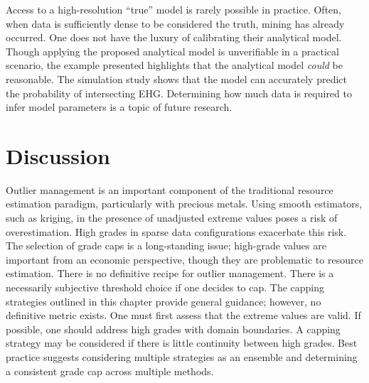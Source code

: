 

Access to a high-resolution ``true'' model is rarely possible in practice. Often, when data is sufficiently dense to be considered the truth, mining has already occurred. One does not have the luxury of calibrating their analytical model. Though applying the proposed analytical model is unverifiable in a practical scenario, the example presented highlights that the analytical model \emph{could} be reasonable. The simulation study shows that the model can accurately predict the probability of intersecting \gls{EHG}. Determining how much data is required to infer model parameters is a topic of future research.

\FloatBarrier
\section{Discussion}
\label{sec:02discuss}

Outlier management is an important component of the traditional resource estimation paradigm, particularly with precious metals. Using smooth estimators, such as kriging, in the presence of unadjusted extreme values poses a risk of overestimation. High grades in sparse data configurations exacerbate this risk. The selection of grade caps is a long-standing issue; high-grade values are important from an economic perspective, though they are problematic to resource estimation. There is no definitive recipe for outlier management. There is a necessarily subjective threshold choice if one decides to cap. The capping strategies outlined in this chapter provide general guidance; however, no definitive metric exists. One must first assess that the extreme values are valid. If possible, one should address high grades with domain boundaries. A capping strategy may be considered if there is little continuity between high grades. Best practice suggests considering multiple strategies as an ensemble and determining a consistent grade cap across multiple methods.

